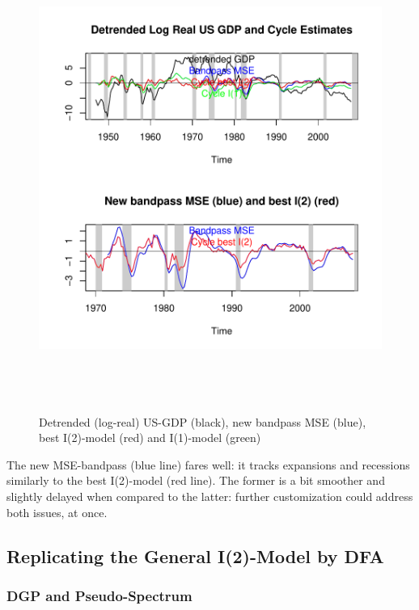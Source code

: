 \documentclass[a4paper]{book}
\begin{document}
\begin{enumerate}
\begin{figure}[H]\begin{center}\includegraphics[height=6in, width=6in]{z_us_real_log_gdp_detrended_filt_bp}\caption{Detrended (log-real) US-GDP (black), new bandpass MSE (blue), best I(2)-model (red) and I(1)-model (green)   \label{z_us_real_log_gdp_detrended_filt_bp}}\end{center}\end{figure}\end{enumerate}
The new MSE-bandpass (blue line) fares well: it tracks expansions and recessions similarly to the best I(2)-model (red line). The former is a bit smoother and slightly delayed when compared to the latter: further customization could address both issues, at once.




\subsection{Replicating the General I(2)-Model by DFA}\label{rep_cy_mba_dfa_i2}


\subsubsection{DGP and Pseudo-Spectrum}\label{rep_i2_bp}
\end{document}
